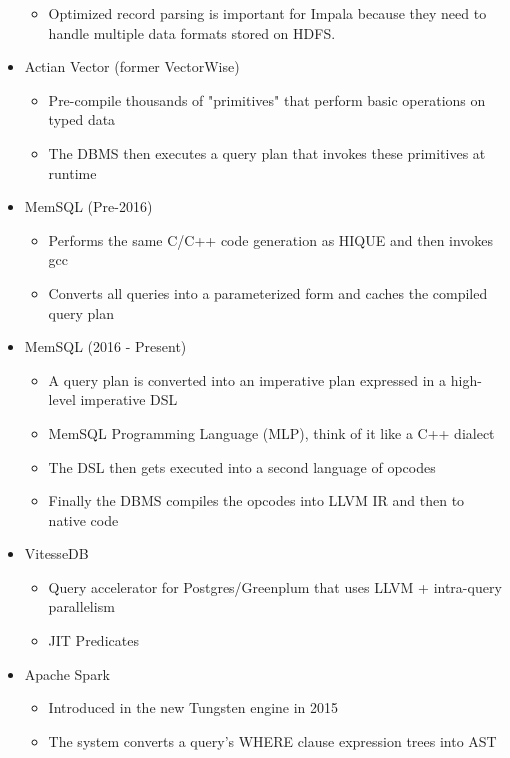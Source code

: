 \documentclass[11pt]{article}
\begin{document}
\begin{itemize}
\begin{itemize}
        \item
        Optimized record parsing is important for Impala because they need to handle multiple 
        data formats stored on HDFS.
    \end{itemize}
    
    \item Actian Vector (former VectorWise)~\cite{raducanu13}
    \begin{itemize}
        \item Pre-compile thousands of "primitives" that perform basic operations on typed data
        \item The DBMS then executes a query plan that invokes these primitives at runtime
    \end{itemize}
    \item MemSQL (Pre-2016)
    \begin{itemize}
        \item Performs the same C/C++ code generation as HIQUE and then invokes gcc
        \item Converts all queries into a parameterized form and caches the compiled query plan
    \end{itemize}
    \item MemSQL (2016 - Present)
    \begin{itemize}
        \item A query plan is converted into an imperative plan expressed in a high-level imperative DSL
        \item MemSQL Programming Language (MLP), think of it like a C++ dialect
        \item The DSL then gets executed into a second language of opcodes
        \item Finally the DBMS compiles the opcodes into LLVM IR and then to native code
    \end{itemize}
    \item VitesseDB
    \begin{itemize}
        \item Query accelerator for Postgres/Greenplum that uses LLVM + intra-query parallelism
        \item JIT Predicates
    \end{itemize}
    \item Apache Spark
    \begin{itemize}
        \item Introduced in the new Tungsten engine in 2015
        \item The system converts a query's WHERE clause expression trees into AST

\end{itemize}
\end{itemize}
\end{document}
